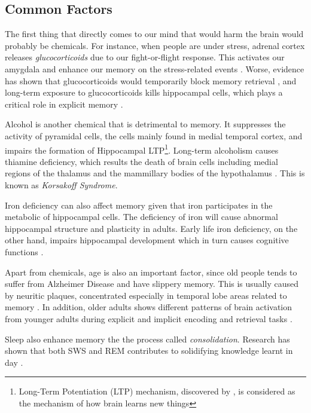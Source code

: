 \documentclass{article}
\begin{document}
\subsection{Common Factors}

The first thing that directly comes to our mind that would harm the brain would probably be chemicals. For instance, when people are under stress, adrenal cortex releases \textit{glucocorticoids} due to our fight-or-flight response. This activates our amygdala and enhance our memory on the stress-related events \autocite{sapolskyStressAgingBrain1992}. Worse, evidence has shown that glucocorticoids would temporarily block memory retrieval \autocite[pp.119-144]{roozendaalStressMemoryAmygdala2009}, and long-term exposure to glucocorticoids kills hippocampal cells, which plays a critical role in explicit memory \autocite{sapolskyStressAgingBrain1992}. 

Alcohol is another chemical that is detrimental to memory. It suppresses the activity of pyramidal cells, the cells mainly found in medial temporal cortex, and impairs the formation of Hippocampal LTP\footnote{Long-Term Potentiation (LTP) mechanism, discovered by \textcite{blissLonglastingPotentiationSynaptic1973}, is considered as the mechanism of how brain learns new things}. Long-term alcoholism causes thiamine deficiency, which results the death of brain cells including medial regions of the thalamus and the mammillary bodies of the hypothalamus \autocite{martinRoleThiamineDeficiency2003}. This is known as \textit{Korsakoff Syndrome}. 

Iron deficiency can also affect memory given that iron participates in the metabolic of hippocampal cells. The deficiency of iron will cause abnormal hippocampal structure and plasticity in adults. Early life iron deficiency, on the other hand, impairs hippocampal development which in turn causes cognitive functions \autocite{frethamRoleIronLearning2011}.

Apart from chemicals, age is also an important factor, since old people tends to suffer from Alzheimer Disease and have slippery memory. This is usually caused by neuritic plaques, concentrated especially in temporal lobe areas related to memory \autocite{kolbIntroductionBrainBehavior2019}. In addition, older adults shows different patterns of brain activation from younger adults during explicit and implicit encoding and retrieval tasks \autocite{backmanBrainActivationYoung1997}.

Sleep also enhance memory the the process called \textit{consolidation}. Research has shown that both SWS and REM contributes to solidifying knowledge learnt in day \autocite{diekelmannMemoryFunctionSleep2010}.

\printbibliography{}
\end{document}
